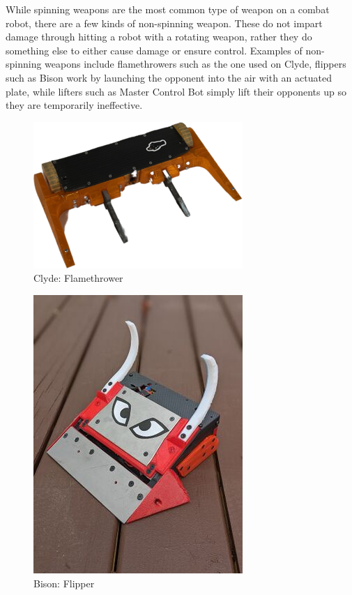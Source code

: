 \documentclass[conference]{IEEEtran}
\begin{document}
While spinning weapons are the most common type of weapon on a combat robot, there are a few kinds of non-spinning weapon.  These do not impart damage through hitting a robot with a rotating weapon, rather they do something else to either cause damage or ensure control.  Examples of non-spinning weapons include flamethrowers such as the one used on Clyde, flippers such as Bison work by launching the opponent into the air with an actuated plate, while lifters such as Master Control Bot simply lift their opponents up so they are temporarily ineffective.

\begin{figure}[htp]
\centering
\includegraphics[scale=0.4]{clyde.png}
\caption{Clyde: Flamethrower \cite{b2}}
\label{Clyde: Flamethrower}
\end{figure}

\begin{figure}[htp]
\centering
\includegraphics[scale=0.4]{bison.jpg}
\caption{Bison: Flipper \cite{b2}}
\label{Bison: Flipper}
\end{figure}
\end{document}
